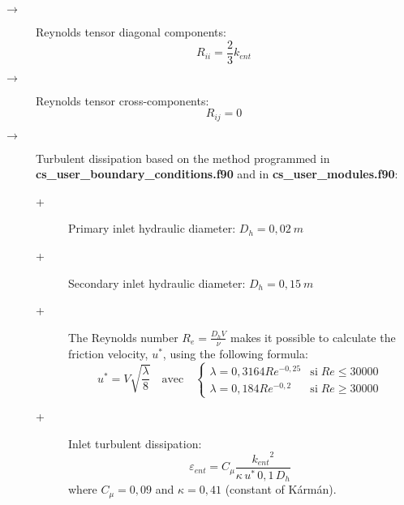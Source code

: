 \begin{itemize}
\begin{description}
\begin{description}
            \item[$\rightarrow$] Reynolds tensor diagonal components:
                  \begin{displaymath}
                     R_{ii} = \frac{2}{3} k_{ent}
                  \end{displaymath}

            \item[$\rightarrow$] Reynolds tensor cross-components:
                  \begin{displaymath}
                     R_{ij} = 0
                  \end{displaymath}

            \item[$\rightarrow$] Turbulent dissipation based on the method programmed in \textbf{cs\_user\_boundary\_conditions.f90} and in \textbf{cs\_user\_modules.f90}:
                  \begin{description}
                     \item[+] Primary inlet hydraulic diameter: $D_h=0,02~m$
                     \item[+] Secondary inlet hydraulic diameter: $D_h=0,15~m$
                     \item[+] The Reynolds number
                           $\displaystyle{R_e=\frac{D_h V}{\nu}}$ makes it possible to calculate the friction velocity, $u^*$, using the following formula:
                           \begin{displaymath}
                              u^* = V \sqrt{\frac{\lambda}{8}} \quad \text{avec} \quad
                              \begin{cases}
                                 \displaystyle
                                 \lambda = 0,3164 Re^{-0,25} & \text{si} \; Re \leq 30000 \\
                                 \lambda = 0,184 Re^{-0,2}   & \text{si} \; Re \geq 30000
                              \end{cases}
                           \end{displaymath}
                     \item[+] Inlet turbulent dissipation:
                           \begin{displaymath}
                              \varepsilon_{ent} = C_{\mu} \frac{{k_{ent}}^2}{\kappa \, u^* \, 0,1 \, D_h}
                           \end{displaymath}
                           where $C_{\mu}=0,09$ and $\kappa=0,41$ (constant of K\'arm\'an).
                  \end{description}


\end{description}
\end{description}
\end{itemize}
